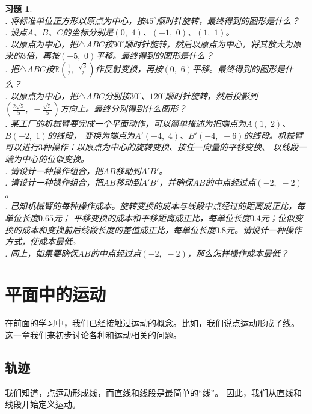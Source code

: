 \documentclass[12pt,UTF8]{ctexbook}
\newtheorem{xt}{习题}[section]
\begin{document}
\begin{xt}
    \mbox{}\\
    . 将标准单位正方形以原点为中心，按$45^\circ$顺时针旋转，最终得到的图形是什么？\\
    . 设点$A$、$B$、$C$的坐标分别是$(0,\,\, 4)$、$(-1,\,\, 0)$、$(1,\,\,1)$。\\
    . 以原点为中心，把$\triangle ABC$按$90^\circ$顺时针旋转，然后以原点为中心，将其放大为原来的$3$倍，再按$(-5, \,\, 0)$平移。最终得到的图形是什么？\\
    . 把$\triangle ABC$按$\mathbb{R}\left(\frac{1}{2},\,\, \frac{\sqrt{3}}{2}\right)$作反射变换，再按$(0,\,\, 6)$平移。最终得到的图形是什么？\\
    . 以原点为中心，把$\triangle ABC$分别按$30^\circ$、$120^\circ$顺时针旋转，然后投影到$\left(\frac{2\sqrt{5}}{5},\,\, -\frac{\sqrt{5}}{5}\right)$方向上。最终分别得到什么图形？\\
    . 某工厂的机械臂要完成一个平面动作，可以简单描述为把端点为$A(1,\,\, 2)$、$B(-2,\,\, 1)$的线段，
    变换为端点为$A'(-4,\,\, 4)$、$B'(-4,\,\, -6)$的线段。机械臂可以进行$3$种操作：以原点为中心的旋转变换、按任一向量的平移变换、
    以线段一端为中心的位似变换。\\
    . 请设计一种操作组合，把$AB$移动到$A'B'$。\\
    . 请设计一种操作组合，把$AB$移动到$A'B'$，并确保$AB$的中点经过点$(-2,\,\, -2)$。\\
    . 已知机械臂的每种操作成本。旋转变换的成本与线段中点经过的距离成正比，每单位长度$0.65$元；
    平移变换的成本和平移距离成正比，每单位长度$0.4$元；位似变换的成本和变换前后线段长度的差值成正比，每单位长度$0.8$元。请设计一种操作方式，使成本最低。\\
    . 同上，如果要确保$AB$的中点经过点$(-2,\,\, -2)$，那么怎样操作成本最低？
\end{xt}

\chapter{平面中的运动}
在前面的学习中，我们已经接触过运动的概念。比如，我们说点运动形成了线。
这一章我们来初步讨论各种和运动相关的问题。

\section{轨迹}
我们知道，点运动形成线，而直线和线段是最简单的“线”。
因此，我们从直线和线段开始定义运动。
\end{document}
